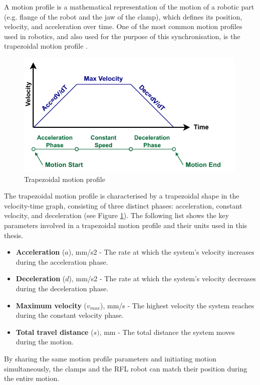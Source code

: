 A motion profile is a mathematical representation of the motion of a robotic part (e.g. flange of the robot and the jaw of the clamp), which defines its position, velocity, and acceleration over time. One of the most common motion profiles used in robotics, and also used for the purpose of this synchronisation, is the trapezoidal motion profile \parencite{tanPrecisionMotionControl2001}.

\begin{figure}
    \centering
    \includegraphics[width=0.99\textwidth]{images/05/trapezoidal-profile.pdf}
    \caption{Trapezoidal motion profile}
    \label{fig:trapezoidal-motion-profile}
\end{figure}

The trapezoidal motion profile is characterised by a trapezoidal shape in the velocity-time graph, consisting of three distinct phases: acceleration, constant velocity, and deceleration (see Figure \ref{fig:trapezoidal-motion-profile}). The following list shows the key parameters involved in a trapezoidal motion profile and their units used in this thesis.

\begin{itemize}
    \item \textbf{Acceleration} ($a$), mm/s2 - The rate at which the system's velocity increases during the acceleration phase. 
    \item \textbf{Deceleration} ($d$), mm/s2 - The rate at which the system's velocity decreases during the deceleration phase.
    \item \textbf{Maximum velocity} ($v_{max}$), mm/s - The highest velocity the system reaches during the constant velocity phase.
    \item \textbf{Total travel distance} ($s)$, mm - The total distance the system moves during the motion. 
\end{itemize}
By sharing the same motion profile parameters and initiating motion simultaneously, the clamps  and the RFL robot can match their position during the entire  motion.


